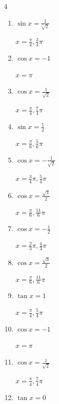 \begin{multicols}{4}
\begin{enumerate}
  \item $\displaystyle \sin{x}  = \frac{1}{\sqrt{2}}$

        $\displaystyle x = \frac{\pi}{4} , \frac{3}{4}\pi$

  \item $\displaystyle \cos{x}  = -1$

        $\displaystyle x = \pi$

  \item $\displaystyle \cos{x}  = \frac{1}{\sqrt{2}}$

        $\displaystyle x = \frac{\pi}{4} , \frac{7}{4}\pi$

  \item $\displaystyle \sin{x}  = \frac{1}{2}$

        $\displaystyle x = \frac{\pi}{6} , \frac{5}{6}\pi$

  \item $\displaystyle \cos{x}  = -\frac{1}{\sqrt{2}}$

        $\displaystyle x = \frac{3}{4}\pi , \frac{5}{4}\pi$

  \item $\displaystyle \cos{x}  = \frac{\sqrt{3}}{2}$

        $\displaystyle x = \frac{\pi}{6} , \frac{11}{6}\pi$

  \item $\displaystyle \cos{x}  = -\frac{1}{2}$

        $\displaystyle x = \frac{2}{3}\pi , \frac{4}{3}\pi$

  \item $\displaystyle \cos{x}  = \frac{\sqrt{3}}{2}$

        $\displaystyle x = \frac{\pi}{6} , \frac{11}{6}\pi$

  \item $\displaystyle \tan{x}  = 1$

        $\displaystyle x = \frac{\pi}{4} , \frac{5}{4}\pi$

\columnbreak %

  \item $\displaystyle \cos{x}  = -1$

        $\displaystyle x = \pi$

  \item $\displaystyle \cos{x}  = \frac{1}{\sqrt{2}}$

        $\displaystyle x = \frac{\pi}{4} , \frac{7}{4}\pi$

  \item $\displaystyle \tan{x}  = 0$


\end{enumerate}
\end{multicols}

